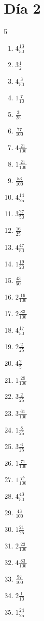 \documentclass[12pt]{article}
\begin{document}
\section*{Día 2}
\begin{multicols}{5}\begin{enumerate}
		\item $ 4 \frac{13}{50} $
		\item $ 3 \frac{1}{2} $
		\item $ 4 \frac{3}{50} $
		\item $ 1 \frac{7}{10} $
		\item $ \frac{3}{25} $
		\item $ \frac{77}{100} $
		\item $ 4 \frac{21}{100} $
		\item $ 1 \frac{21}{100} $
		\item $ \frac{53}{100} $
		\item $ 4 \frac{14}{25} $
		\item $ 3 \frac{27}{50} $
		\item $ \frac{16}{25} $
		\item $ 4 \frac{47}{50} $
		\item $ 1 \frac{19}{20} $
		\item $ \frac{43}{50} $
		\item $ 2 \frac{19}{100} $
		\item $ 2 \frac{83}{100} $
		\item $ 4 \frac{17}{50} $
		\item $ 2 \frac{2}{25} $
		\item $ 4 \frac{2}{5} $
		\item $ 1 \frac{29}{100} $
		\item $ 3 \frac{2}{25} $
		\item $ 3 \frac{61}{100} $
		\item $ 1 \frac{8}{25} $
		\item $ 3 \frac{6}{25} $
		\item $ 1 \frac{71}{100} $
		\item $ 1 \frac{77}{100} $
		\item $ 4 \frac{43}{50} $
		\item $ \frac{43}{100} $
		\item $ 1 \frac{21}{25} $
		\item $ 2 \frac{23}{100} $
		\item $ 4 \frac{83}{100} $
		\item $ \frac{97}{100} $
		\item $ 2 \frac{1}{10} $
		\item $ 1 \frac{24}{25} $

\end{enumerate}
\end{multicols}
\end{document}
